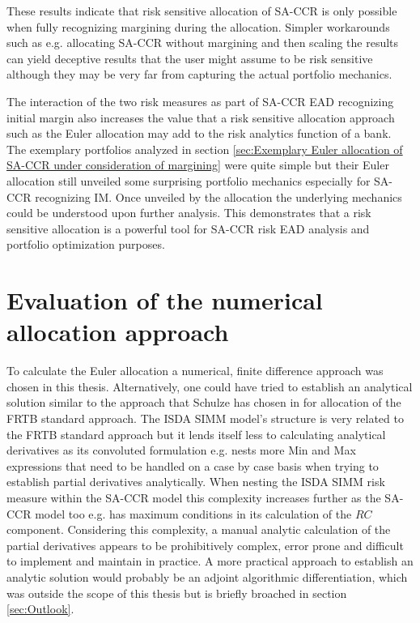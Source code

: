 \documentclass[../Thesis_AHoecherl.tex]{subfiles}
\begin{document}
    These results indicate that risk sensitive allocation of SA-CCR is only possible when fully recognizing margining during the allocation. Simpler workarounds such as e.g. allocating SA-CCR without margining and then scaling the results can yield deceptive results that the user might assume to be risk sensitive although they may be very far from capturing the actual portfolio mechanics.
    
    The interaction of the two risk measures as part of SA-CCR EAD recognizing initial margin also increases the value that a risk sensitive allocation approach such as the Euler allocation may add to the risk analytics function of a bank.
    The exemplary portfolios analyzed in section \ref{sec:Exemplary Euler allocation of SA-CCR under consideration of margining} were quite simple but their Euler allocation still unveiled some surprising portfolio mechanics especially for SA-CCR recognizing IM.
    Once unveiled by the allocation the underlying mechanics could be understood upon further analysis. This demonstrates that a risk sensitive allocation is a powerful tool for SA-CCR risk EAD analysis and portfolio optimization purposes.

    \section{Evaluation of the numerical allocation approach\label{Evaluation of the numerical allocation approach}}

    To calculate the Euler allocation a numerical, finite difference approach was chosen in this thesis. Alternatively, one could have tried to establish an analytical solution similar to the approach that Schulze has chosen in \cite{schulze2018capital} for allocation of the FRTB standard approach.
    The ISDA SIMM model's structure is very related to the FRTB standard approach but it lends itself less to calculating analytical derivatives as its convoluted formulation e.g. nests more Min and Max expressions that need to be handled on a case by case basis when trying to establish partial derivatives analytically.
    When nesting the ISDA SIMM risk measure within the SA-CCR model this complexity increases further as the SA-CCR model too e.g. has maximum conditions in its calculation of the $RC$ component.
    Considering this complexity, a manual analytic calculation of the partial derivatives appears to be prohibitively complex, error prone and difficult to implement and maintain in practice.
    A more practical approach to establish an analytic solution would probably be an adjoint algorithmic differentiation, which was outside the scope of this thesis but is briefly broached in section \ref{sec:Outlook}.
\end{document}
